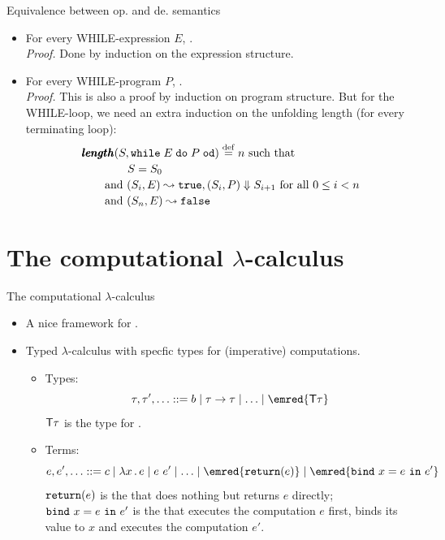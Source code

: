\documentclass[paper=screen,mode=present,style=zysimple]{powerdot}
\begin{document}
\begin{slide}{Equivalence between op. and de. semantics}
\begin{itemize}
\item For every WHILE-expression $E$, .
\\[0.2em]
{\em Proof.} Done by induction on the expression structure.
\\[0.3em]
\item For every WHILE-program  $P$, .
\\[0.2em]
{\em Proof.} This is also a proof by induction on program structure. But for the WHILE-loop, 
we need an extra induction on the unfolding length (for every terminating loop):
\[
\begin{array}{l}
\pmb{length} (S, \mathtt{while}\; {E} \; \mathtt{do} \; {P} \; \mathtt{od}) \stackrel{\mathrm{def}}{=} n \mbox{ such that} 
\\[0.2em] \qquad \qquad 
S = S_0 
\\[0.2em] \qquad 
\mbox{and } (S_i, E) \leadsto \mathtt{true} ,  (S_{i}, P) \Downarrow S_{i + 1} 
\mbox{ for all } 0 \leq i < n 
\\[0.2em] \qquad 
\mbox{and } (S_n, E) \leadsto \mathtt{false} 
\end{array}
\]
\end{itemize}
\end{slide}

\section{The computational $\lambda$-calculus}

\begin{slide}{The computational $\lambda$-calculus}
\begin{itemize}
\item A nice framework for  \emgreen{[Moggi'89]}. 
\item Typed $\lambda$-calculus with specfic types for (imperative) computations.
\begin{itemize} \small
\item Types: \vspace*{-0.8em}
$$\tau, \tau', \ldots ::= b \mid \tau \to \tau \mid \ldots \mid \emred{\tcomp \tau} $$
$\mathsf{T} \tau$ is the type for . 
\item Terms: \vspace*{-0.8em}
$$ 
e, e', \ldots ::= c \mid \lambda x \ldot e \mid e \ e' \mid \ldots \mid \emred{\cval(e)} 
\mid  \emred{\cbind{x}{e}{e'}} 
\vspace*{-0.5em}
$$
$\mathtt{return}(e)$ is the  that does nothing but returns $e$ directly; 
$\mathtt{bind} \ {x} = {e} \ \mathtt{in} \ {e'}$ is the  that 
executes the computation $e$ first, binds its value to $x$ and executes the computation $e'$.
\end{itemize}
\end{itemize}
\end{slide}
\end{document}
